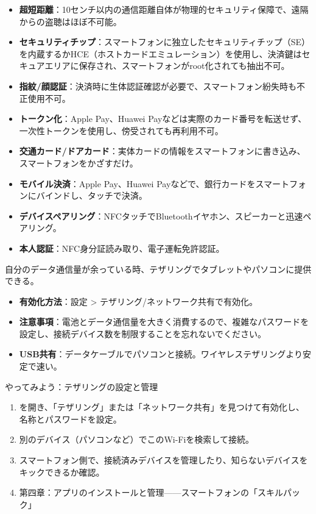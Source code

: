 \begin{itemize}
  \item \textbf{超短距離}：10センチ以内の通信距離自体が物理的セキュリティ保障で、遠隔からの盗聴はほぼ不可能。
  \item \textbf{セキュリティチップ}：スマートフォンに独立したセキュリティチップ（SE）を内蔵するかHCE（ホストカードエミュレーション）を使用し、決済鍵はセキュアエリアに保存され、スマートフォンがroot化されても抽出不可。
  \item \textbf{指紋/顔認証}：決済時に生体認証確認が必要で、スマートフォン紛失時も不正使用不可。
  \item \textbf{トークン化}：Apple Pay、Huawei Payなどは実際のカード番号を転送せず、一次性トークンを使用し、傍受されても再利用不可。
\end{itemize}


\begin{itemize}
  \item \textbf{交通カード/ドアカード}：実体カードの情報をスマートフォンに書き込み、スマートフォンをかざすだけ。
  \item \textbf{モバイル決済}：Apple Pay、Huawei Payなどで、銀行カードをスマートフォンにバインドし、タッチで決済。
  \item \textbf{デバイスペアリング}：NFCタッチでBluetoothイヤホン、スピーカーと迅速ペアリング。
  \item \textbf{本人認証}：NFC身分証読み取り、電子運転免許認証。
\end{itemize}


自分のデータ通信量が余っている時、テザリングでタブレットやパソコンに提供できる。

\begin{itemize}
  \item \textbf{有効化方法}：設定 > テザリング/ネットワーク共有で有効化。
  \item \textbf{注意事項}：電池とデータ通信量を大きく消費するので、複雑なパスワードを設定し、接続デバイス数を制限することを忘れないでください。
  \item \textbf{USB共有}：データケーブルでパソコンと接続。ワイヤレステザリングより安定で速い。
\end{itemize}

\begin{tcbpractice}{やってみよう：テザリングの設定と管理}
\begin{enumerate}
  \item [設定]を開き、「テザリング」または「ネットワーク共有」を見つけて有効化し、名称とパスワードを設定。
  \item 別のデバイス（パソコンなど）でこのWi-Fiを検索して接続。
  \item スマートフォン側で、接続済みデバイスを管理したり、知らないデバイスをキックできるか確認。
  \item 第四章：アプリのインストールと管理——スマートフォンの「スキルパック」
\end{enumerate}

\end{tcbpractice}
